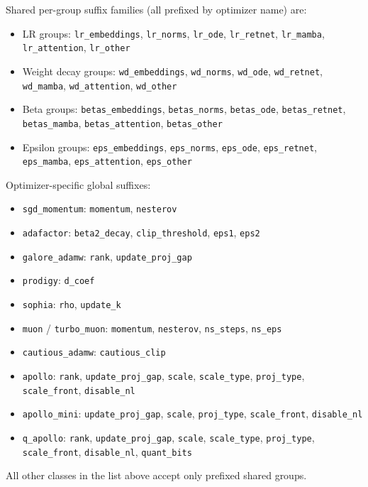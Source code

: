 \documentclass[11pt,a4paper]{article}
\begin{document}
Shared per-group suffix families (all prefixed by optimizer name) are:
\begin{itemize}[leftmargin=*]
    \item LR groups: \texttt{lr\_embeddings}, \texttt{lr\_norms}, \texttt{lr\_ode}, \texttt{lr\_retnet}, \texttt{lr\_mamba}, \texttt{lr\_attention}, \texttt{lr\_other}
    \item Weight decay groups: \texttt{wd\_embeddings}, \texttt{wd\_norms}, \texttt{wd\_ode}, \texttt{wd\_retnet}, \texttt{wd\_mamba}, \texttt{wd\_attention}, \texttt{wd\_other}
    \item Beta groups: \texttt{betas\_embeddings}, \texttt{betas\_norms}, \texttt{betas\_ode}, \texttt{betas\_retnet}, \texttt{betas\_mamba}, \texttt{betas\_attention}, \texttt{betas\_other}
    \item Epsilon groups: \texttt{eps\_embeddings}, \texttt{eps\_norms}, \texttt{eps\_ode}, \texttt{eps\_retnet}, \texttt{eps\_mamba}, \texttt{eps\_attention}, \texttt{eps\_other}
\end{itemize}

Optimizer-specific global suffixes:
\begin{itemize}[leftmargin=*]
    \item \texttt{sgd\_momentum}: \texttt{momentum}, \texttt{nesterov}
    \item \texttt{adafactor}: \texttt{beta2\_decay}, \texttt{clip\_threshold}, \texttt{eps1}, \texttt{eps2}
    \item \texttt{galore\_adamw}: \texttt{rank}, \texttt{update\_proj\_gap}
    \item \texttt{prodigy}: \texttt{d\_coef}
    \item \texttt{sophia}: \texttt{rho}, \texttt{update\_k}
    \item \texttt{muon} / \texttt{turbo\_muon}: \texttt{momentum}, \texttt{nesterov}, \texttt{ns\_steps}, \texttt{ns\_eps}
    \item \texttt{cautious\_adamw}: \texttt{cautious\_clip}
    \item \texttt{apollo}: \texttt{rank}, \texttt{update\_proj\_gap}, \texttt{scale}, \texttt{scale\_type}, \texttt{proj\_type}, \texttt{scale\_front}, \texttt{disable\_nl}
    \item \texttt{apollo\_mini}: \texttt{update\_proj\_gap}, \texttt{scale}, \texttt{proj\_type}, \texttt{scale\_front}, \texttt{disable\_nl}
    \item \texttt{q\_apollo}: \texttt{rank}, \texttt{update\_proj\_gap}, \texttt{scale}, \texttt{scale\_type}, \texttt{proj\_type}, \texttt{scale\_front}, \texttt{disable\_nl}, \texttt{quant\_bits}
\end{itemize}
All other classes in the list above accept only prefixed shared groups.
\end{document}
